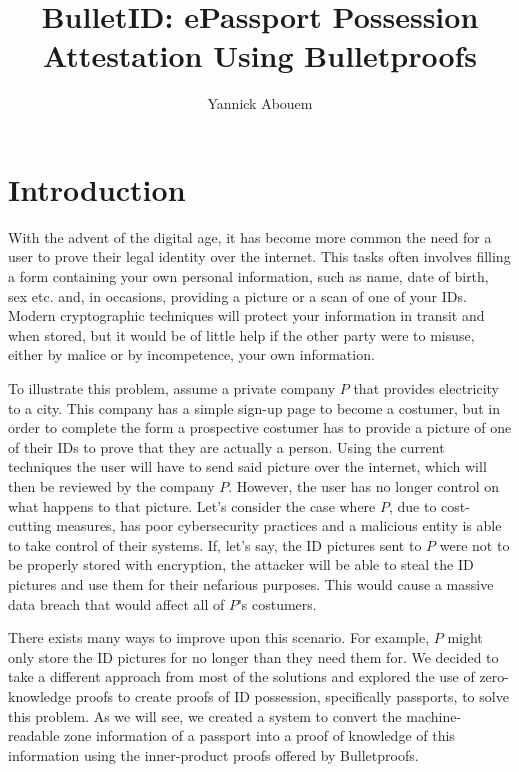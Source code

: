 \documentclass[sigconf,screen,nonacm]{acmart}
\title[BulletID]{BulletID: ePassport Possession Attestation Using Bulletproofs}
\author{Yannick Abouem}
\affiliation{
  \institution{Queen's University}
  \department{School of Computing}
  \city{Kingston}
  \state{ON}
  \country{Canada}
}
\begin{document}
  \maketitle

  \section{Introduction}

  With the advent of the digital age, it has become more common the need for a user
  to prove their legal identity over the internet. This tasks often involves filling
  a form containing your own personal information, such as name, date of birth, sex
  etc. and, in occasions, providing a picture or a scan of one of your IDs. Modern
  cryptographic techniques will protect your information in transit and when stored,
  but it would be of little help if the other party were to misuse, either by malice
  or by incompetence, your own information.

  To illustrate this problem, assume a private company $P$ that provides electricity
  to a city. This company has a simple sign-up page to become a costumer, but in
  order to complete the form a prospective costumer has to provide a picture of one
  of their IDs to prove that they are actually a person. Using the current techniques
  the user will have to send said picture over the internet, which will then be
  reviewed by the company $P$. However, the user has no longer control on what
  happens to that picture. Let's consider the case where $P$, due to cost-cutting
  measures, has poor cybersecurity practices and a malicious entity is able to take
  control of their systems. If, let's say, the ID pictures sent to $P$ were not to
  be properly stored with encryption, the attacker will be able to steal the ID
  pictures and use them for their nefarious purposes. This would cause a massive
  data breach that would affect all of $P$'s costumers.

  There exists many ways to improve upon this scenario. For example, $P$ might only
  store the ID pictures for no longer than they need them for. We decided to take a
  different approach from most of the solutions and explored the use of zero-knowledge
  proofs to create proofs of ID possession, specifically passports, to solve
  this problem. As we will see, we created a system to convert the machine-readable
  zone information of a passport into a proof of knowledge of this information
  using the inner-product proofs offered by Bulletproofs.
\end{document}
